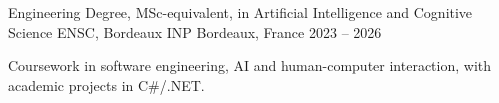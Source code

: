 
\begin{cventries}
  \cventry
    {Engineering Degree, MSc-equivalent, in Artificial Intelligence and Cognitive Science}
    {ENSC, Bordeaux INP}
    {Bordeaux, France}
    {2023 -- 2026}
    {
      \begin{cvitems}
        \item {Coursework in software engineering, AI and human-computer interaction, with academic projects in C\#/.NET.}
      \end{cvitems}
    }
\end{cventries}
